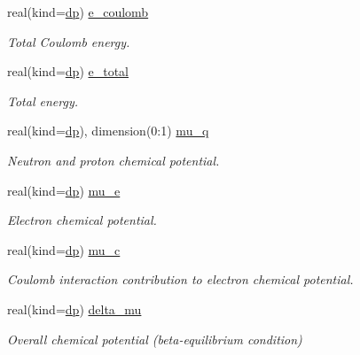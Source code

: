 \begin{DoxyCompactItemize}
real(kind=\mbox{\hyperlink{namespaceparameters_a52f8c6351fd79345d8811e065bcbbb37}{dp}}) \mbox{\hyperlink{group__WS__PROPERTIES_gaa693f79a53c67f65948484a0d2704154}{e\+\_\+coulomb}}
\begin{DoxyCompactList}\small\item\em Total Coulomb energy. \end{DoxyCompactList}\item 
real(kind=\mbox{\hyperlink{namespaceparameters_a52f8c6351fd79345d8811e065bcbbb37}{dp}}) \mbox{\hyperlink{group__WS__PROPERTIES_ga041ce78d1803675af0825ead4e0a512e}{e\+\_\+total}}
\begin{DoxyCompactList}\small\item\em Total energy. \end{DoxyCompactList}\item 
real(kind=\mbox{\hyperlink{namespaceparameters_a52f8c6351fd79345d8811e065bcbbb37}{dp}}), dimension(0\+:1) \mbox{\hyperlink{group__WS__PROPERTIES_ga640fd108640984ca51ba2f7cc29f2a8f}{mu\+\_\+q}}
\begin{DoxyCompactList}\small\item\em Neutron and proton chemical potential. \end{DoxyCompactList}\item 
real(kind=\mbox{\hyperlink{namespaceparameters_a52f8c6351fd79345d8811e065bcbbb37}{dp}}) \mbox{\hyperlink{group__WS__PROPERTIES_gacc0c124d82adcdfb692fb32f9e736bca}{mu\+\_\+e}}
\begin{DoxyCompactList}\small\item\em Electron chemical potential. \end{DoxyCompactList}\item 
real(kind=\mbox{\hyperlink{namespaceparameters_a52f8c6351fd79345d8811e065bcbbb37}{dp}}) \mbox{\hyperlink{group__WS__PROPERTIES_ga3025178429abf0548bda508408facd69}{mu\+\_\+c}}
\begin{DoxyCompactList}\small\item\em Coulomb interaction contribution to electron chemical potential. \end{DoxyCompactList}\item 
real(kind=\mbox{\hyperlink{namespaceparameters_a52f8c6351fd79345d8811e065bcbbb37}{dp}}) \mbox{\hyperlink{group__WS__PROPERTIES_ga44464a0deab6ab30fe9c2301379ceb71}{delta\+\_\+mu}}
\begin{DoxyCompactList}\small\item\em Overall chemical potential (beta-\/equilibrium condition) \end{DoxyCompactList}\item 

\end{DoxyCompactItemize}
